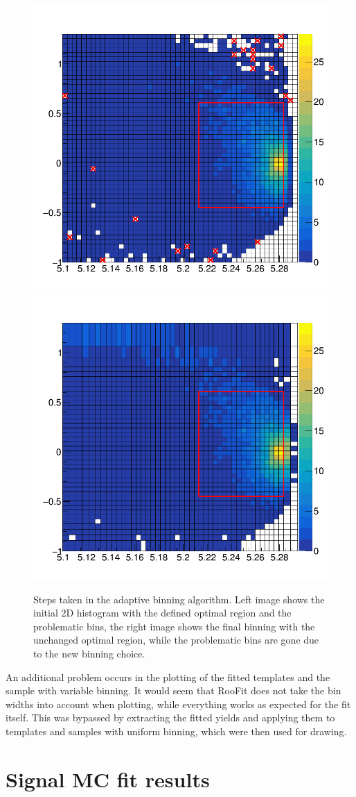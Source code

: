 \begin{figure}[H]
	\centering
	\captionsetup{width=0.8\linewidth}
	\includegraphics[width=0.49\linewidth]{fig/adaptive_1}
	\includegraphics[width=0.49\linewidth]{fig/adaptive_15}
	\caption{Steps taken in the adaptive binning algorithm. Left image shows the initial 2D histogram with the defined optimal region and the problematic bins, the right image shows the final binning with the unchanged optimal region, while the problematic bins are gone due to the new binning choice.}
	\label{fig:adapt}
\end{figure}

An additional problem occurs in the plotting of the fitted templates and the sample with variable binning. It would seem that RooFit does not take the bin widths into account when plotting, while everything works as expected for the fit itself. This was bypassed by extracting the fitted yields and applying them to templates and samples with uniform binning, which were then used for drawing.

\section{Signal MC fit results}\label{sec:signal-mc-fit-results}

